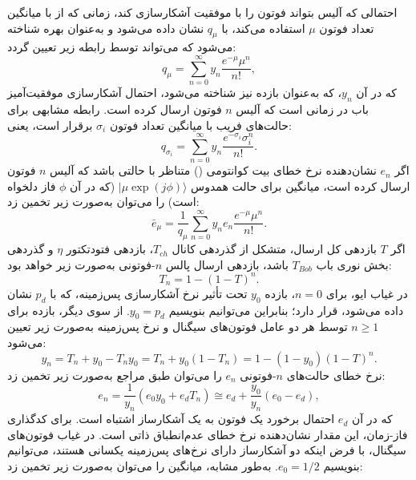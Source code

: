 احتمالی که آلیس بتواند فوتون را با موفقیت آشکارسازی کند، زمانی که از  با میانگین تعداد فوتون $\mu$ استفاده می‌کند، با $q_\mu$ نشان داده می‌شود و به‌عنوان بهره شناخته می‌شود که می‌تواند توسط رابطه زیر تعیین گردد:
\begin{equation}
	q_\mu = \sum_{n=0}^{\infty} y_n \frac{e^{-\mu} \mu^n}{n!},
	\label{eq:8-6}
\end{equation}
که در آن $y_n$، که به‌عنوان بازده نیز شناخته می‌شود، احتمال آشکارسازی موفقیت‌آمیز باب در زمانی است که آلیس $n$ فوتون ارسال کرده است. رابطه مشابهی برای حالت‌های فریب با میانگین تعداد فوتون $\sigma_i$ برقرار است، یعنی:
\begin{equation}
	q_{\sigma_i} = \sum_{n=0}^{\infty} y_n \frac{e^{-\sigma_i} \sigma_i^n}{n!}.
	\label{eq:8-7}
\end{equation}
اگر $e_n$ نشان‌دهنده نرخ خطای بیت کوانتومی () متناظر با حالتی باشد که آلیس $n$ فوتون ارسال کرده است، میانگین  برای حالت همدوس $|\mu \exp(j\phi)\rangle$ (که در آن $\phi$ فاز دلخواه است) را می‌توان به‌صورت زیر تخمین زد:
\begin{equation}
	\bar{e}_\mu = \frac{1}{q_\mu} \sum_{n=0}^{\infty} y_n e_n \frac{e^{-\mu} \mu^n}{n!}.
	\label{eq:8-8}
\end{equation}
اگر $T$ بازدهی کل ارسال، متشکل از گذردهی کانال $T_{ch}$، بازدهی فتودتکتور $\eta$ و گذردهی بخش نوری باب $T_{Bob}$ باشد، بازدهی ارسال پالس $n$-فوتونی به‌صورت زیر خواهد بود:
\begin{equation}
	T_n = 1 - (1 - T)^n.
	\label{eq:8-9}
\end{equation}
در غیاب ایو، برای $n=0$، بازده $y_0$ تحت تأثیر نرخ آشکارسازی پس‌زمینه، که با $p_d$ نشان داده می‌شود، قرار دارد؛ بنابراین می‌توانیم بنویسیم $y_0 = p_d$. از سوی دیگر، بازده برای $n \geq 1$ توسط هر دو عامل فوتون‌های سیگنال و نرخ پس‌زمینه به‌صورت زیر تعیین می‌شود:
\begin{equation}
	y_n = T_n + y_0 - T_n y_0 = T_n + y_0(1 - T_n) = 1 - (1 - y_0)(1 - T)^n.
	\label{eq:8-10}
\end{equation}
نرخ خطای حالت‌های $n$-فوتونی $e_n$ را می‌توان طبق مراجع \cite{8-10, 8-22} به‌صورت زیر تخمین زد:
\begin{equation}
	e_n = \frac{1}{y_n} (e_0 y_0 + e_d T_n) \cong e_d + \frac{y_0}{y_n} (e_0 - e_d),
	\label{eq:8-11}
\end{equation}
که در آن $e_d$ احتمال برخورد یک فوتون به یک آشکارساز اشتباه است. برای کدگذاری فاز-زمان، این مقدار نشان‌دهنده نرخ خطای عدم‌انطباق ذاتی است. در غیاب فوتون‌های سیگنال، با فرض اینکه دو آشکارساز دارای نرخ‌های پس‌زمینه یکسانی هستند، می‌توانیم بنویسیم $e_0 = 1/2$. به‌طور مشابه، میانگین  را می‌توان به‌صورت زیر تخمین زد:
